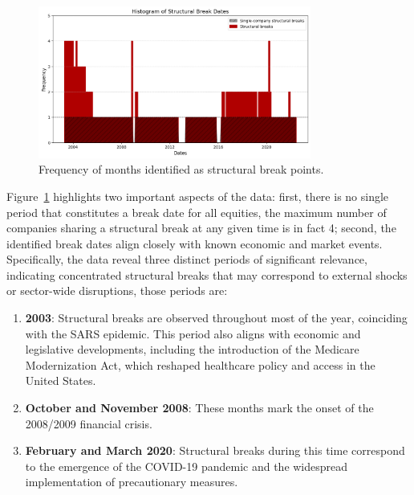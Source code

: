 \begin{figure}[h!]
    \centering
    \includegraphics[width=0.8\textwidth]{images/struct_break_freqs.png}
    \caption{Frequency of months identified as structural break points.}\label{fig:struct_break_freqs}
\end{figure}

Figure~\ref{fig:struct_break_freqs} highlights two important aspects of the data: 
first, there is no single period that constitutes a break date for all equities, the maximum number of companies sharing a 
structural break at any given time is in fact 4; second, the identified break dates align closely with known economic and
market events.
Specifically, the data reveal three distinct periods of significant relevance, indicating concentrated structural breaks 
that may correspond to external shocks or sector-wide disruptions, those periods are:

\begin{enumerate}
    \item  \textbf{2003}: Structural breaks are observed throughout most of the year, coinciding with the SARS epidemic. 
    This period also aligns with economic and legislative developments, including the introduction of the Medicare
    Modernization Act, which reshaped healthcare policy and access in the United States.
    \item \textbf{October and November 2008}: These months mark the onset of the 2008/2009 financial crisis.
    \item \textbf{February and March 2020}: Structural breaks during this time correspond to the emergence of the COVID-19
    pandemic and the widespread implementation of precautionary measures.
\end{enumerate}

